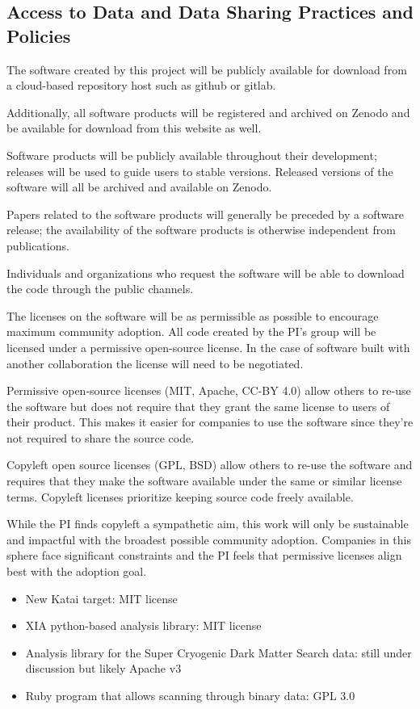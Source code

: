 \documentclass[11pt]{article}
\begin{document}
\subsection{Access to Data and Data Sharing Practices and Policies}
The software created by this project will be publicly available for download from a cloud-based repository host such as github or gitlab.

Additionally, all software products will be registered and archived on Zenodo and be available for download from this website as well.

Software products will be publicly available throughout their development; releases will be used to guide users to stable versions.  Released versions of the software will all be archived and available on Zenodo.

Papers related to the software products will generally be preceded by a software release; the availability of the software products is otherwise independent from publications.

Individuals and organizations who request the software will be able to download the code through the public channels.

The licenses on the software will be as permissible as possible to encourage maximum community adoption.  All code created by the PI's group will be licensed under a permissive open-source license.  In the case of software built with another collaboration the license will need to be negotiated.

Permissive open-source licenses (MIT, Apache, CC-BY 4.0) allow others to re-use the software but does not require that they grant the same license to users of their product.  This makes it easier for companies to use the software since they're not required to share the source code.

Copyleft open source licenses (GPL, BSD) allow others to re-use the software and requires that they make the software available under the same or similar license terms.  Copyleft licenses prioritize keeping source code freely available.  

While the PI finds copyleft a sympathetic aim, this work will only be sustainable and impactful with the broadest possible community adoption.  Companies in this sphere face significant constraints and the PI feels that permissive licenses align best with the adoption goal. 

\begin{itemize}
    \item New Katai target: MIT license
    \item XIA python-based analysis library: MIT license
    \item Analysis library for the Super Cryogenic Dark Matter Search data: still under discussion but likely Apache v3
    \item Ruby program that allows scanning through binary data: GPL 3.0
\end{itemize}
\end{document}

